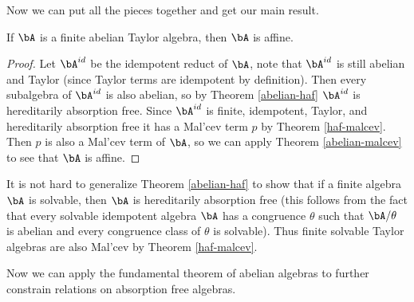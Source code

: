 Now we can put all the pieces together and get our main result.

\begin{thm}\label{taylor-abelian} If $\bA$ is a finite abelian Taylor algebra, then $\bA$ is affine.
\end{thm}
\begin{proof} Let $\bA^{id}$ be the idempotent reduct of $\bA$, note that $\bA^{id}$ is still abelian and Taylor (since Taylor terms are idempotent by definition). Then every subalgebra of $\bA^{id}$ is also abelian, so by Theorem \ref{abelian-haf} $\bA^{id}$ is hereditarily absorption free. Since $\bA^{id}$ is finite, idempotent, Taylor, and hereditarily absorption free it has a Mal'cev term $p$ by Theorem \ref{haf-malcev}. Then $p$ is also a Mal'cev term of $\bA$, so we can apply Theorem \ref{abelian-malcev} to see that $\bA$ is affine.
\end{proof}

\begin{rem} It is not hard to generalize Theorem \ref{abelian-haf} to show that if a finite algebra $\bA$ is solvable, then $\bA$ is hereditarily absorption free (this follows from the fact that every solvable idempotent algebra $\bA$ has a congruence $\theta$ such that $\bA/\theta$ is abelian and every congruence class of $\theta$ is solvable). Thus finite solvable Taylor algebras are also Mal'cev by Theorem \ref{haf-malcev}.
\end{rem}

Now we can apply the fundamental theorem of abelian algebras to further constrain relations on absorption free algebras.

